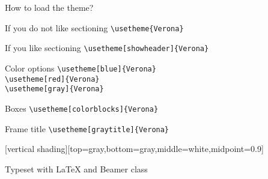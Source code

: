 \documentclass[10pt]{beamer}
\begin{document}
\begin{frame}[fragile]{How to load the theme?}

\begin{block}{If you do not like sectioning}
\verb!\usetheme{Verona}!
\end{block}

\begin{block}{If you like sectioning}
\verb!\usetheme[showheader]{Verona}!
\end{block}

\begin{alertblock}{Color options}
\verb!\usetheme[blue]{Verona}!\\
\verb!\usetheme[red]{Verona}!\\
\verb!\usetheme[gray]{Verona}!\\
\end{alertblock}
\begin{alertblock}{Boxes}
\verb!\usetheme[colorblocks]{Verona}!\\
\end{alertblock}
\begin{alertblock}{Frame title}
\verb!\usetheme[graytitle]{Verona}!
\end{alertblock}

\end{frame}
[vertical shading][top=gray,bottom=gray,middle=white,midpoint=0.9]
\begin{frame}[plain]{}
\vspace*{7cm}
\small
\textcolor{black!10}{Typeset with \LaTeX{} and Beamer class}
\end{frame}
\end{document}
